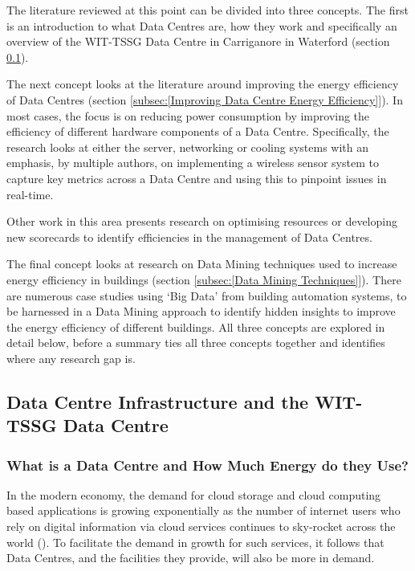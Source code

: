 \documentclass[12pt]{scrartcl}
\begin{document}
The literature reviewed at this point can be divided into three concepts. The first is an introduction to what Data Centres are, how they work and specifically an overview of the WIT-TSSG Data Centre in Carriganore in Waterford (section \ref{subsec:[Data Centre Infrastructure and the WIT-TSSG Data Centre]}).  

The next concept looks at the literature around improving the energy efficiency of Data Centres (section \ref{subsec:[Improving Data Centre Energy Efficiency]}). In most cases, the focus is on reducing power consumption by improving the efficiency of different hardware components of a Data Centre. Specifically, the research looks at either the server, networking or cooling systems with an emphasis, by multiple authors, on implementing a wireless sensor system to capture key metrics across a Data Centre and using this to pinpoint issues in real-time. 

Other work in this area presents research on optimising resources or developing new scorecards to identify efficiencies in the management of Data Centres. 

The final concept looks at research on Data Mining techniques used to increase energy efficiency in buildings (section \ref{subsec:[Data Mining Techniques]}). There are numerous case studies using `Big Data' from building automation systems, to be harnessed in a Data Mining approach to identify hidden insights to improve the energy efficiency of different buildings. All three concepts are explored in detail below, before a summary ties all three concepts together and identifies where any research gap is.      

\subsection{Data Centre Infrastructure and the WIT-TSSG Data Centre}
\label{subsec:[Data Centre Infrastructure and the WIT-TSSG Data Centre]}

\subsubsection{What is a Data Centre and How Much Energy do they Use?}
\label{subsubsec:[What is a Data Centre and How Much Energy do they Use?]}

In the modern economy, the demand for cloud storage and cloud computing based applications is growing exponentially as the number of internet users who rely on digital information via cloud services continues to sky-rocket across the world (\citep{VASUDEVAN201794}). To facilitate the demand in growth for such services, it follows that Data Centres, and the facilities they provide, will also be more in demand.  
\end{document}
